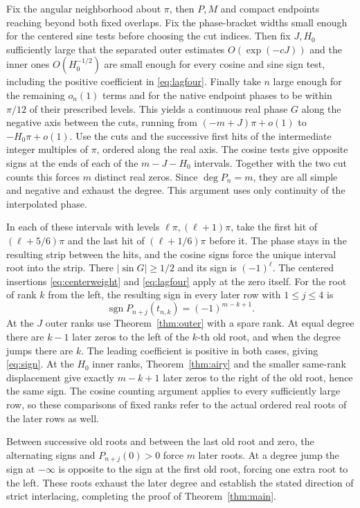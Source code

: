 \documentclass[11pt]{article}
\begin{document}
Fix the angular neighborhood about \(\pi\), then \(P,M\) and compact endpoints reaching beyond both fixed overlaps. Fix the phase-bracket widths small enough for the centered sine tests before choosing the cut indices. Then fix \(J,H_0\) sufficiently large that the separated outer estimates \(O(\exp(-cJ))\) and the inner ones \(O(H_0^{-1/2})\) are small enough for every cosine and sine sign test, including the positive coefficient in \eqref{eq:lagfour}. Finally take \(n\) large enough for the remaining \(o_n(1)\) terms and for the native endpoint phases to be within \(\pi/12\) of their prescribed levels. This yields a continuous real phase \(G\) along the negative axis between the cuts, running from \((-m+J)\pi+o(1)\) to \(-H_0\pi+o(1)\). Use the cuts and the successive first hits of the intermediate integer multiples of \(\pi\), ordered along the real axis. The cosine tests give opposite signs at the ends of each of the \(m-J-H_0\) intervals. Together with the two cut counts this forces \(m\) distinct real zeros. Since \(\deg P_n=m\), they are all simple and negative and exhaust the degree. This argument uses only continuity of the interpolated phase.

In each of these intervals with levels \(\ell\pi,(\ell+1)\pi\), take the first hit of \((\ell+5/6)\pi\) and the last hit of \((\ell+1/6)\pi\) before it. The phase stays in the resulting strip between the hits, and the cosine signs force the unique interval root into the strip. There \(|\sin G|\ge1/2\) and its sign is \((-1)^\ell\). The centered insertions \eqref{eq:centerweight} and \eqref{eq:lagfour} apply at the zero itself. For the root of rank \(k\) from the left, the resulting sign in every later row with \(1\le j\le4\) is
\begin{equation}\label{eq:sign}
 \operatorname{sgn}P_{n+j}(t_{n,k})=(-1)^{m-k+1}.
\end{equation}
At the \(J\) outer ranks use Theorem~\ref{thm:outer} with a spare rank. At equal degree there are \(k-1\) later zeros to the left of the \(k\)-th old root, and when the degree jumps there are \(k\). The leading coefficient is positive in both cases, giving \eqref{eq:sign}. At the \(H_0\) inner ranks, Theorem~\ref{thm:airy} and the smaller same-rank displacement give exactly \(m-k+1\) later zeros to the right of the old root, hence the same sign. The cosine counting argument applies to every sufficiently large row, so these comparisons of fixed ranks refer to the actual ordered real roots of the later rows as well.

Between successive old roots and between the last old root and zero, the alternating signs and \(P_{n+j}(0)>0\) force \(m\) later roots. At a degree jump the sign at \(-\infty\) is opposite to the sign at the first old root, forcing one extra root to the left. These roots exhaust the later degree and establish the stated direction of strict interlacing, completing the proof of Theorem~\ref{thm:main}.
\end{document}
